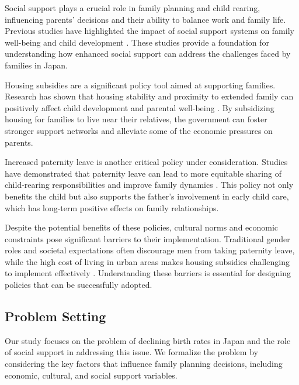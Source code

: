 \documentclass{article} %
\begin{document}
Social support plays a crucial role in family planning and child rearing, influencing parents' decisions and their ability to balance work and family life. Previous studies have highlighted the impact of social support systems on family well-being and child development \citep{park2023generative, shanahan2023role}. These studies provide a foundation for understanding how enhanced social support can address the challenges faced by families in Japan.

Housing subsidies are a significant policy tool aimed at supporting families. Research has shown that housing stability and proximity to extended family can positively affect child development and parental well-being \citep{liu2023agentbench}. By subsidizing housing for families to live near their relatives, the government can foster stronger support networks and alleviate some of the economic pressures on parents.

Increased paternity leave is another critical policy under consideration. Studies have demonstrated that paternity leave can lead to more equitable sharing of child-rearing responsibilities and improve family dynamics \citep{wang2023describe}. This policy not only benefits the child but also supports the father's involvement in early child care, which has long-term positive effects on family relationships.

Despite the potential benefits of these policies, cultural norms and economic constraints pose significant barriers to their implementation. Traditional gender roles and societal expectations often discourage men from taking paternity leave, while the high cost of living in urban areas makes housing subsidies challenging to implement effectively \citep{poledna2023economic}. Understanding these barriers is essential for designing policies that can be successfully adopted.

\subsection{Problem Setting}
\label{sec:problem_setting}

Our study focuses on the problem of declining birth rates in Japan and the role of social support in addressing this issue. We formalize the problem by considering the key factors that influence family planning decisions, including economic, cultural, and social support variables.
\end{document}
